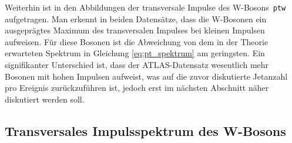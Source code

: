 \documentclass[11pt, a4paper]{article}
\numberwithin{equation}{section}
\begin{document}
Weiterhin ist in den Abbildungen der transversale Impulse des W-Bosons~\texttt{ptw} aufgetragen.
Man erkennt in beiden Datensätze, dass die W-Bosonen ein ausgeprägtes Maximum des transversalen Impulses bei kleinen Impulsen aufweisen.
Für diese Bosonen ist die Abweichung von dem in der Theorie erwarteten Spektrum in Gleichung \eqref{eq:pt_spektrum} am geringsten.
Ein signifikanter Unterschied ist, dass der ATLAS-Datensatz wesentlich mehr Bosonen mit hohen Impulsen aufweist, was auf die zuvor diskutierte Jetanzahl pro Ereignis zurückzuführen ist, jedoch erst im nächsten Abschnitt näher diskutiert werden soll.

\clearpage
\subsection{Transversales Impulsspektrum des W-Bosons}
\label{ssec:ptw_spektrum}
\end{document}
